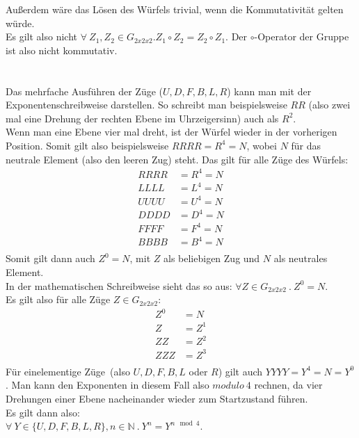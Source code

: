 \documentclass[12pt,a4paper, usenames, dvipsnames]{article}
\begin{document}
Außerdem wäre das Lösen des Würfels trivial, wenn die Kommutativität gelten würde.\cite{TD} \\
Es gilt also nicht $\forall \  Z_1, Z_2 \in G_{2x2x2}. Z_1 \circ Z_2 = Z_2 \circ Z_1$. Der $\circ$-Operator der Gruppe ist also nicht kommutativ. \\
\\
\\
Das mehrfache Ausführen der Züge ($U, D, F, B, L, R$) kann man mit der Exponentenschreibweise darstellen. So schreibt man beispielsweise $RR$ (also zwei mal eine Drehung der rechten Ebene im Uhrzeigersinn) auch als $R^2$. \\
Wenn man eine Ebene vier mal dreht, ist der Würfel wieder in der vorherigen Position. Somit gilt also beispielsweise $RRRR=R^4=N$, wobei $N$ für das neutrale Element (also den leeren Zug) steht. Das gilt für alle Züge des Würfels:
\\
\begin{align*}
RRRR & =R^4 =N \\
LLLL & =L^4 =N \\
UUUU & =U^4 =N \\
DDDD & =D^4 =N \\
FFFF & =F^4 =N \\
BBBB & =B^4 =N \\
\end{align*}
Somit gilt dann auch $Z^0=N$, mit $Z$ als beliebigen Zug und $N$ als neutrales Element. \\
In der mathematischen Schreibweise sieht das so aus: $\forall Z \in G_{2x2x2} \ . \ Z^0=N$. \\
Es gilt also für alle Züge $Z \in G_{2x2x2}$: 
\begin{align*}
Z^0 & =N \\
Z & =Z^1 \\
ZZ & =Z^2 \\
ZZZ & =Z^3 \\
\end{align*}
Für \glqq einelementige Züge\grqq \  (also $U, D, F, B, L$ oder $R$) gilt auch $YYYY =Y^4=N=Y^0$.
Man kann den Exponenten in diesem Fall also $modulo \ 4$ rechnen, da vier Drehungen einer Ebene nacheinander wieder zum Startzustand führen. \\
Es gilt dann also: \\
$\forall \  Y \in \{U, D, F, B, L, R\}, n \in \mathbb{N} \ . \ Y^n=Y^{n \mod 4}$.
\newpage
\end{document}
